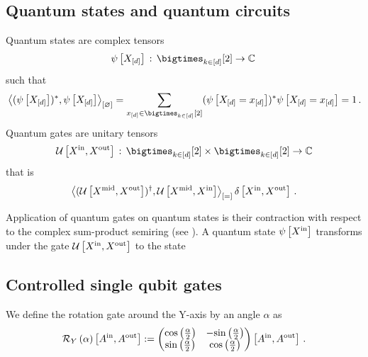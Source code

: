 \subsection{Quantum states and quantum circuits}

Quantum states are complex tensors
\begin{align*}
    \qstateat{\shortcatvariables} \defcols \atomstates \rightarrow \compnums \,
\end{align*}
such that
\begin{align*}
    \contraction{( \qstateat{\shortcatvariables})^*,\qstatewith}
    =\sum_{\shortcatindices\in\atomstates} ( \qstateat{\indexedshortcatvariables})^* \qstateat{\indexedshortcatvariables}
    =1 \, .
\end{align*}
Quantum gates are unitary tensors
\begin{align*}
    \unitaryat{\ccatvariable{\insymbol},\ccatvariable{\outsymbol}}
    \defcols \atomstates \times \atomstates \rightarrow \compnums
\end{align*}
that is
\begin{align*}
    \left\langle (\mathcal{U}\left[X^{\mathrm{mid}},X^{\mathrm{out}}\right])^\dagger, \mathcal{U}\left[X^{\mathrm{mid}},X^{\mathrm{in}}\right]\right\rangle_{\left[ = \right]} \delta\left[X^{\mathrm{in}},X^{\mathrm{out}}\right] \, .
\end{align*}

Application of quantum gates on quantum states is their contraction with respect to the complex sum-product semiring (see ).
A quantum state $\psi\left[X^{\mathrm{in}}\right]$ transforms under the gate $\mathcal{U}\left[X^{\mathrm{in}},X^{\mathrm{out}}\right]$ to the state

\subsection{Controlled single qubit gates}

We define the rotation gate around the Y-axis by an angle $\alpha$ as
\begin{align*}
    \mathcal{R}_Y\left({\alpha}\right)\left[A^{\mathrm{in}},A^{\mathrm{out}}\right] :=
    \begin{pmatrix} 
        \mathrm{cos}\left(\frac{\alpha}{2}\right) & -\mathrm{sin}\left(\frac{\alpha}{2}\right) \\
        \mathrm{sin}\left(\frac{\alpha}{2}\right) & \mathrm{cos}\left(\frac{\alpha}{2}\right)
     \end{pmatrix}\left[A^{\mathrm{in}},A^{\mathrm{out}}\right] \, .
\end{align*}

